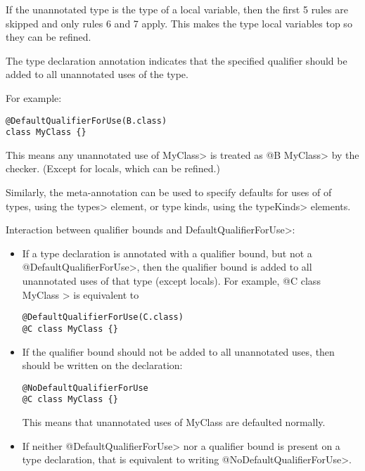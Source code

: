 If the unannotated type is the type of a local variable, then the first 5 rules are skipped and only
rules 6 and 7 apply.  This makes the type local variables top so they can be refined.


The type declaration annotation 
indicates that the specified qualifier should be added to all unannotated uses of the type.

For example:
\begin{Verbatim}
@DefaultQualifierForUse(B.class)
class MyClass {}
\end{Verbatim}

This means any unannotated use of \<MyClass> is treated as \<@B MyClass> by the checker.
(Except for locals, which can be refined.)

Similarly, the meta-annotation  can be used to specify defaults
for uses of of types, using the \<types> element, or type kinds, using the \<typeKinds> elements.

Interaction between qualifier bounds and \<DefaultQualifierForUse>:
\begin{itemize}
\item
  If a type declaration is annotated with a qualifier bound, but not a \<@DefaultQualifierForUse>,
  then the qualifier bound is added to all unannotated uses of that type (except locals).
  For example, \<@C class MyClass {}> is equivalent to
\begin{Verbatim}
@DefaultQualifierForUse(C.class)
@C class MyClass {}
\end{Verbatim}

\item
  If the qualifier bound should not be added to all unannotated uses, then
   should be written on the declaration:
\begin{Verbatim}
@NoDefaultQualifierForUse
@C class MyClass {}
\end{Verbatim}
  This means that unannotated uses of MyClass are defaulted normally.
\item
  If neither \<@DefaultQualifierForUse> nor a qualifier bound is present on a type declaration, that
  is equivalent to writing \<@NoDefaultQualifierForUse>.

\end{itemize}

